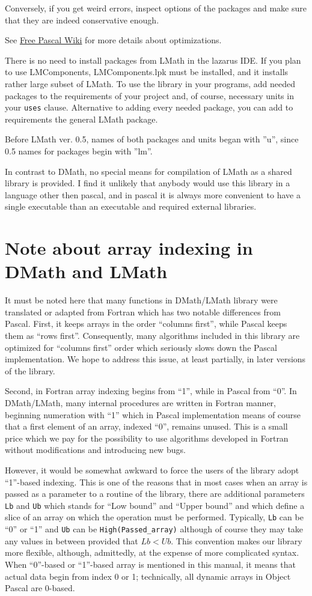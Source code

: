 \documentclass[12pt,a4paper,oneside]{article}
\newcommand{\code}[1]{\texttt{#1}}
\begin{document}
Conversely, if you get weird errors, inspect options of the packages and make sure that they are indeed conservative enough.

See \href{https://wiki.freepascal.org/Optimization}{Free Pascal Wiki} for more details about optimizations.
 
There is no need to install packages from LMath in the lazarus IDE. If you plan to use LMComponents, LMComponents.lpk must be installed, and it installs rather large subset of LMath. To use the library in your programs, add needed packages to the requirements of your project and, of course, necessary units in your \code{uses} clause. Alternative to adding every needed package, you can add to requirements the general LMath package.

Before LMath ver. 0.5, names of both packages and units began with ''u'', since 0.5 names for packages begin with ''lm''. 

In contrast to DMath, no special means for compilation of LMath as a shared library is provided. I find it unlikely that anybody would use this library in a language other then pascal, and in pascal it is always more convenient to have a single executable than an executable and required external libraries.
\section{Note about array indexing in DMath and LMath}
It must be noted here that many functions in DMath/LMath library were translated or adapted from Fortran which has two notable differences from Pascal. First, it keeps arrays in the order ``columns first'', while Pascal keeps them as ``rows first''. Consequently, many algorithms included in this library are optimized for ``columns first'' order which seriously slows down the Pascal implementation. We hope to address this issue, at least partially, in later versions of the library.

Second, in Fortran array indexing begins from ``1'', while in Pascal from ``0''. In DMath/LMath, many internal procedures are written in Fortran manner, beginning numeration with ``1'' which in Pascal implementation means of course that a first element of an array, indexed ``0'', remains unused. This is a small price which we pay for the possibility to use algorithms developed in Fortran without modifications and introducing new bugs. 

However, it would be somewhat awkward to force the users of the library adopt ``1''-based indexing. This is one of the reasons that in most cases when an array is passed as a parameter to a routine of the library, there are additional parameters \code{Lb} and \code{Ub} which stands for ``Low bound'' and ``Upper bound'' and which define a slice of an array on which the operation must be performed. Typically, \code{Lb} can be ``0'' or ``1'' and \code{Ub} can be \code{High(Passed\_array)} although of course they may take any values in between provided that $Lb<Ub$. This convention makes our library more flexible, although, admittedly, at the expense of more complicated syntax. When ``0''-based or ``1''-based array is mentioned in this manual, it means that actual data begin from index 0 or 1; technically, all dynamic arrays in Object Pascal are 0-based.
\end{document}
